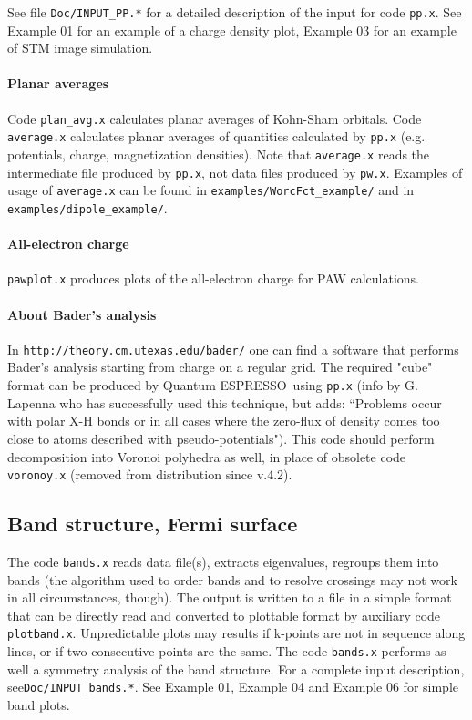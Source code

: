 \documentclass[12pt,a4paper]{article}
\def\qe{{\sc Quantum ESPRESSO}}
\def\pwx{\texttt{pw.x}}
\begin{document}
See file \texttt{Doc/INPUT\_PP.*} for a detailed description of the input
for code \texttt{pp.x}.
See Example 01 for an example of a charge density plot, Example 03
for an example of STM image simulation.

\paragraph{Planar averages}
Code \texttt{plan\_avg.x} calculates planar averages of Kohn-Sham orbitals.
Code \texttt{average.x} calculates planar averages of quantities calculated
by \texttt{pp.x} (e.g. potentials, charge, magnetization densities).
Note that \texttt{average.x} reads the intermediate file produced
by \texttt{pp.x}, not data files produced by \pwx. Examples of usage 
of \texttt{average.x} can be found in \texttt{examples/WorcFct\_example/} 
and in \texttt{examples/dipole\_example/}.

\paragraph{All-electron charge}
\texttt{pawplot.x} produces plots of the all-electron charge
for PAW calculations.

\paragraph{About Bader's analysis}
In \texttt{http://theory.cm.utexas.edu/bader/} one can find a software 
that performs
Bader's analysis starting from charge on a regular grid. The required 
"cube" format can be produced by \qe\ using  \texttt{pp.x} (info by G. Lapenna
who has successfully used this technique, but adds: ``Problems occur with polar 
X-H bonds or in all cases where the zero-flux of density comes too close to 
atoms described with pseudo-potentials"). This code should perform 
decomposition into Voronoi polyhedra as well, in place of obsolete
code  \texttt{voronoy.x} (removed from distribution since v.4.2).

\subsection{Band structure, Fermi surface}

The code \texttt{bands.x} reads data file(s), extracts eigenvalues,
regroups them into bands (the algorithm used to order bands and to resolve
crossings may not work in all circumstances, though). The output is written
to a file in a simple format that can be directly read and converted to
plottable format by auxiliary code
\texttt{plotband.x}. Unpredictable plots may results if k-points are not 
in sequence along lines, or if two consecutive points are the same. 
The code \texttt{bands.x} performs as well a 
symmetry analysis of the band structure. For a complete input description,
see\texttt{Doc/INPUT\_bands.*}. See Example 01, Example 04 and Example 06 
for simple band plots.
\end{document}
